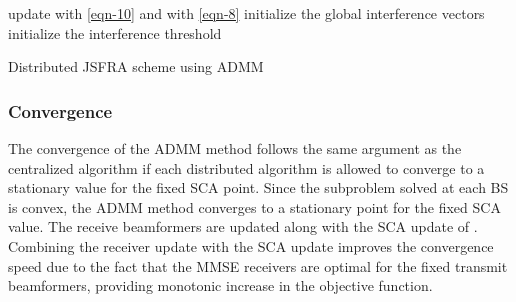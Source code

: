 {\allowdisplaybreaks 
\begin{algorithm}
	\SetAlgoLined
	\DontPrintSemicolon
	\BlankLine
	update  with \eqref{eqn-10} and  with \eqref{eqn-8} \;
	initialize the global interference vectors  \;
	initialize the interference threshold  \;
	\caption{Distributed \ac{JSFRA} scheme using \ac{ADMM}}
	\label{algo-3}
\end{algorithm}}

\subsubsection*{Convergence}
The convergence of the \ac{ADMM} method follows the same argument as the centralized algorithm if each distributed algorithm is allowed to converge to a stationary value for the fixed \ac{SCA} point. Since the subproblem solved at each \ac{BS} is convex, the \ac{ADMM} method converges to a stationary point \cite{boyd2011distributed} for the fixed \ac{SCA} value. The receive beamformers are updated along with the \ac{SCA} update of . Combining the receiver update with the \ac{SCA} update improves the convergence speed due to the fact that the \ac{MMSE} receivers are optimal for the fixed transmit beamformers, providing monotonic increase in the objective function.
